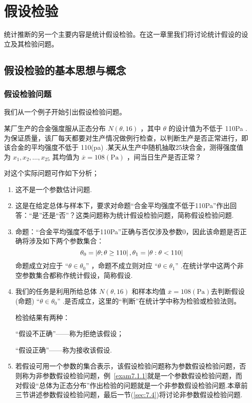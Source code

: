 \chapter{假设检验\label{cha:7}}
统计推断的另一个主要内容是统计假设检验。在这一章里我们将讨论统计假设的设立及其检验问题。

\section{假设检验的基本思想与概念\label{sec:7.1}}
\subsection{假设检验问题\label{7.1.1}}
我们从一个例子开始引出假设检验问题。
\begin{example}\label{exam7.1.1}

某厂生产的合金强度服从正态分布 $N(\theta,16)$ ，其中 $\theta$ 的设计值为不低于 110Pa .为保证质量，该厂每天都要对生产情况做例行检查，以判断生产是否正常进行，即该合金的平均强度不低于 110(pa) .某天从生产中随机抽取25块合金，测得强度值为 $x_{1},x_{2},\dotsc,x_{25}$ 其均值为 $\overline{x}=108(\mathrm {Pa})$ ，间当日生产是否正常？

对这个实际问题可作如下分析；
\begin{enumerate}
	\item 这不是一个参数估计问题.
	
	\item 这是在给定总体与样本下，要求对命题“合金平均强度不低于110Pa”作出回答：“是”还是“否”？这类问题称为统计假设检验问题，简称假设检验问题.
	
	\item 命题：“合金平均强度不低于110Pa”正确与否仅涉及参数0，因此该命题是否正确将涉及如下两个参数集合：
	\[
	\theta_0=\left|\theta ;\theta\geq 110\right|,\\\theta_1=\left|\theta :\theta <110\right|
	\]
	命题成立对应于 “$\theta\in\theta_0$” ，命题不成立则对应 “$\theta\in\theta_1$” .在统计学中这两个非空参数集合都称作统计假设，简称假设.
	\item 我们的任务是利用所给总体 $N(\theta,16)$ 和样本均值 $\overline{x}=108(\mathrm {Pa})$去判断假设(命题) “$\theta\in\theta_0$” .是否成立，这里的“判断”在统计学中称为检验或检验法则。
	
	检验结果有两种：
	\begin{center}
		“假设不正确”——称为拒绝该假设；
		
		“假设正确”——称为接收该假设.
	\end{center}
	\item 若假设可用一个参数的集合表示，该假设检验问题称为参数假设检验问题，否则称为非参数假设检验问题，例~\ref{exam7.1.1}就是一个参数假设检验问题，而对假设“总体为正态分布”作出检验的问题就是一个非参数假设检验问题.本章前三节讲述参数假设检验问题，最后一节(\ref{sec:7.4})将讨论非参数假设检验问题.
\end{enumerate}

\end{example}

